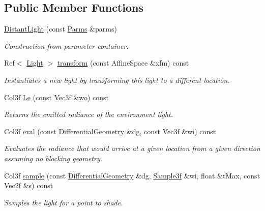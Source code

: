\subsection*{Public Member Functions}
\begin{DoxyCompactItemize}
\item 
\hyperlink{classembree_1_1_distant_light_accafbb074d001ee4f3c361bb80688967}{DistantLight} (const \hyperlink{classembree_1_1_parms}{Parms} \&parms)
\begin{DoxyCompactList}\small\item\em Construction from parameter container. \item\end{DoxyCompactList}\item 
Ref$<$ \hyperlink{classembree_1_1_light}{Light} $>$ \hyperlink{classembree_1_1_distant_light_ad72f9357ea880cf3d080367efc07d381}{transform} (const AffineSpace \&xfm) const 
\begin{DoxyCompactList}\small\item\em Instantiates a new light by transforming this light to a different location. \item\end{DoxyCompactList}\item 
Col3f \hyperlink{classembree_1_1_distant_light_a1a543f0e73d2d4066026b71feec02f02}{Le} (const Vec3f \&wo) const 
\begin{DoxyCompactList}\small\item\em Returns the emitted radiance of the environment light. \item\end{DoxyCompactList}\item 
Col3f \hyperlink{classembree_1_1_distant_light_ad22e8ad0ef213cfd60c6d739d421bf11}{eval} (const \hyperlink{structembree_1_1_differential_geometry}{DifferentialGeometry} \&dg, const Vec3f \&wi) const 
\begin{DoxyCompactList}\small\item\em Evaluates the radiance that would arrive at a given location from a given direction assuming no blocking geometry. \item\end{DoxyCompactList}\item 
Col3f \hyperlink{classembree_1_1_distant_light_af38ed2d63728cdda5387095413aabc48}{sample} (const \hyperlink{structembree_1_1_differential_geometry}{DifferentialGeometry} \&dg, \hyperlink{structembree_1_1_sample}{Sample3f} \&wi, float \&tMax, const Vec2f \&s) const 
\begin{DoxyCompactList}\small\item\em Samples the light for a point to shade. \item\end{DoxyCompactList}\item 

\end{DoxyCompactItemize}
